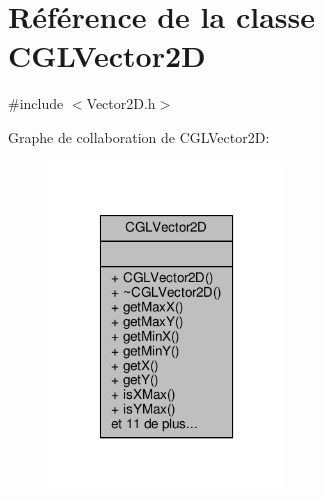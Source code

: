 \hypertarget{class_c_g_l_vector2_d}{\section{Référence de la classe C\-G\-L\-Vector2\-D}
\label{class_c_g_l_vector2_d}
}


{\ttfamily \#include $<$Vector2\-D.\-h$>$}



Graphe de collaboration de C\-G\-L\-Vector2\-D\-:\nopagebreak
\begin{figure}[H]
\begin{center}
\leavevmode
\includegraphics[width=178pt]{db/d79/class_c_g_l_vector2_d__coll__graph}
\end{center}
\end{figure}
